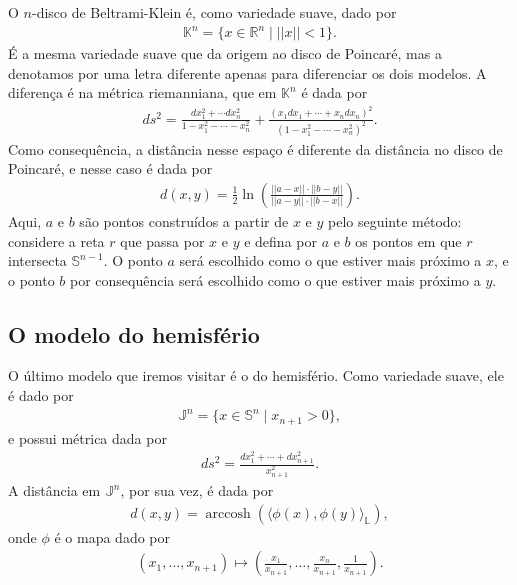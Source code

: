 \documentclass{article}
\DeclareMathOperator{\arccosh}{arccosh}
\begin{document}
O $n$-disco de Beltrami-Klein é, como variedade suave, dado por \begin{align}
    \mathbb{K}^n = \{x \in \mathbb{R}^n \mid ||x|| < 1\}.
\end{align} É a mesma variedade suave que da origem ao disco de Poincaré, mas a denotamos por uma letra diferente apenas para diferenciar os dois modelos. A diferença é na métrica riemanniana, que em $\mathbb{K}^n$ é dada por \begin{align}
    ds^2 = \frac{dx_1^2 + \cdots dx_n^2}{1 - x_1^2 - \cdots - x_n^2} + \frac{(x_1dx_1 + \cdots + x_ndx_n)^2}{(1 - x_1^2 - \cdots - x_n^2)^2}.
\end{align} Como consequência, a distância nesse espaço é diferente da distância no disco de Poincaré, e nesse caso é dada por \begin{align}
    d(x,y) = \frac{1}{2}\ln\left(\frac{||a - x|| \cdot ||b - y||}{||a - y|| \cdot ||b - x||}\right).
\end{align} Aqui, $a$ e $b$ são pontos construídos a partir de $x$ e $y$ pelo seguinte método: considere a reta $r$ que passa por $x$ e $y$ e defina por $a$ e $b$ os pontos em que $r$ intersecta $\mathbb{S}^{n-1}$. O ponto $a$ será escolhido como o que estiver mais próximo a $x$, e o ponto $b$ por consequência será escolhido como o que estiver mais próximo a $y$.

\subsection{O modelo do hemisfério}

O último modelo que iremos visitar é o do hemisfério. Como variedade suave, ele é dado por \begin{align}
    \mathbb{J}^n = \{x \in \mathbb{S}^n \mid x_{n+1} > 0\},
\end{align} e possui métrica dada por \begin{align}
    ds^2 = \frac{dx_1^2 + \cdots + dx_{n+1}^2}{x_{n+1}^2}.
\end{align} A distância em $\mathbb{J}^n$, por sua vez, é dada por \begin{align}
    d(x,y) = \arccosh\left(\langle \phi(x), \phi(y) \rangle_\mathbb{L}\right),
\end{align} onde $\phi$ é o mapa dado por \begin{align}
    (x_1, \dots, x_{n+1}) \mapsto \left(\frac{x_1}{x_{n+1}}, \dots, \frac{x_n}{x_{n+1}}, \frac{1}{x_{n+1}}\right).
\end{align}
\end{document}
